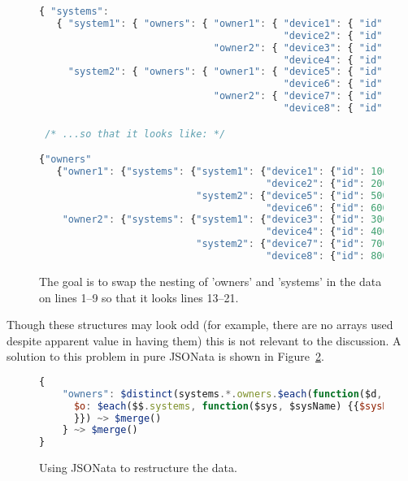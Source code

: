\documentclass[9pt,letterpaper]{article}
\begin{document}
\begin{figure}[H]
  \caption{The goal is to swap the nesting of 'owners' and 'systems' in the data on lines 1--9
  so that it looks lines 13--21.}
 \label{data:simple-restructuring}
\begin{lstlisting}[language=JavaScript,basicstyle=\ttfamily\scriptsize,numberstyle=\scriptsize]
{ "systems":
   { "system1": { "owners": { "owner1": { "device1": { "id": 100, "status": "Ok" },
      	                                  "device2": { "id": 200, "status": "Ok" }},
       	                      "owner2": { "device3": { "id": 300, "status": "Ok" },
                                          "device4": { "id": 400, "status": "Ok" }}}},
     "system2": { "owners": { "owner1": { "device5": { "id": 500, "status": "Ok" },
                                          "device6": { "id": 600, "status": "Ok" }},
                              "owner2": { "device7": { "id": 700, "status": "Ok" },
                                          "device8": { "id": 800, "status": "Ok" }}}}}}

 /* ...so that it looks like: */

{"owners"
   {"owner1": {"systems": {"system1": {"device1": {"id": 100, "status": "Ok"},
                                       "device2": {"id": 200, "status": "Ok"}},
                           "system2": {"device5": {"id": 500, "status": "Ok"},
                                       "device6": {"id": 600, "status": "Ok"}}},
    "owner2": {"systems": {"system1": {"device3": {"id": 300, "status": "Ok"},
                                       "device4": {"id": 400, "status": "Ok"}},
                           "system2": {"device7": {"id": 700, "status": "Ok"},
                                       "device8": {"id": 800, "status": "Ok"}}}}}))))

\end{lstlisting}
\end{figure}

Though these structures may look odd (for example, there are no arrays used despite apparent value in having them)
this is not relevant to the discussion.
A solution to this problem in pure JSONata is shown in Figure~\ref{code:jsonata-sTPDRs}.

\begin{figure}[H]
\caption{Using JSONata to restructure the data.}
 \label{code:jsonata-sTPDRs}
\begin{lstlisting}[language=JavaScript,basicstyle=\ttfamily\scriptsize,numberstyle=\scriptsize]
{
    "owners": $distinct(systems.*.owners.$each(function($d, $ownerName) {$ownerName}))@$o.{
      $o: $each($$.systems, function($sys, $sysName) {{$sysName: $lookup($$.systems, $sysName).owners ~> $lookup($o)
      }}) ~> $merge()
    } ~> $merge()
}
\end{lstlisting}
\end{figure}
\end{document}
